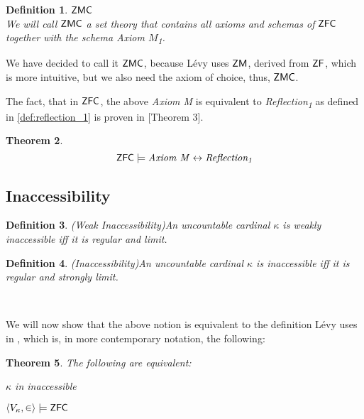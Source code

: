 \documentclass[12pt,a4paper]{article}
\newtheorem{theorem}{Theorem}[section]
\newtheorem{definition}[theorem]{Definition}
\renewcommand{\iff}{\leftrightarrow}
\newcommand{\bce}{\begin{compactenum}}
\newcommand{\ece}{\end{compactenum}}
\begin{document}
\begin{definition}{$\sf{ZMC}$}\\
We will call $\sf{ZMC}$ a set theory that contains all axioms and schemas of $\sf{ZFC}$ together with the schema \emph{Axiom $M$\textsubscript{1}}.
\end{definition}
We have decided to call it $\sf{ZMC}$, because Lévy uses $\sf{ZM}$, derived from $\sf{ZF}$, which is more intuitive, but we also need the axiom of choice, thus, $\sf{ZMC}$.


The fact, that in $\sf{ZFC}$, the above \emph{Axiom M} is equivalent to \emph{Reflection\textsubscript{1}} as defined in \ref{def:reflection_1} is proven in \cite{Levy60a}[Theorem 3].

\begin{theorem}\label{theorem:levy_m_iff_reflection}
\begin{equation}
\sf{ZFC} \models \mbox{\emph{Axiom M}} \iff \mbox{\emph{Reflection\textsubscript{1}}}
\end{equation}
\end{theorem}

\subsection{Inaccessibility}\label{section:inaccessibility}

\begin{definition}{(Weak Inaccessibility)}\label{def:weakly_inaccessible}
An uncountable cardinal $\kappa$ is \emph{weakly inaccessible} iff it is \emph{regular} and \emph{limit}.
\end{definition}
\begin{definition}(Inaccessibility)\label{def:inaccessible}
An uncountable cardinal $\kappa$ is \emph{inaccessible} iff it is \emph{regular} and \emph{strongly limit}.
\end{definition}

\

We will now show that the above notion is equivalent to the definition Lévy uses in \cite{Levy60a}, which is, in more contemporary notation, the following:
\begin{theorem}\label{theorem:inaccessible_models_zfc}
The following are equivalent:
\bce
\item $\kappa$ in inaccessible
\item $\langle V_\kappa, \in \rangle \models \sf{ZFC}$
\ece
\end{theorem}
\end{document}
